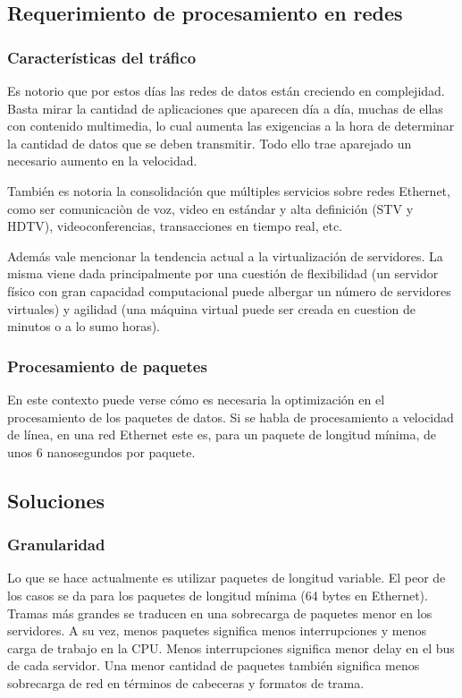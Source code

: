 \subsection{Requerimiento de procesamiento en redes}
\subsubsection{Características del tráfico}
Es notorio que por estos días las redes de datos están creciendo en complejidad. Basta mirar la cantidad de aplicaciones que aparecen día a día, muchas de ellas con contenido multimedia, lo cual aumenta las exigencias a la hora de determinar la cantidad de datos que se deben transmitir. Todo ello trae aparejado un necesario aumento en la velocidad. 

También es notoria la consolidación que múltiples servicios sobre redes Ethernet, como ser comunicaciòn de voz, video en estándar y alta definición (STV y HDTV), videoconferencias, transacciones en tiempo real, etc.

Además vale mencionar la tendencia actual a la virtualización de servidores. La misma viene dada principalmente por una cuestión de flexibilidad (un servidor físico con gran capacidad computacional puede albergar un número de servidores virtuales) y agilidad (una máquina virtual puede ser creada en cuestion de minutos o a lo sumo horas).

\subsubsection{Procesamiento de paquetes}
En este contexto puede verse cómo es necesaria la optimización en el procesamiento de los paquetes de datos. Si se habla de procesamiento a velocidad de línea, en una red Ethernet este es, para un paquete de longitud mínima, de unos 6 nanosegundos por paquete.


\subsection{Soluciones}
\subsubsection{Granularidad}
Lo que se hace actualmente es utilizar paquetes de longitud variable. El peor de los casos se da para los paquetes de longitud mínima (64 bytes en Ethernet). Tramas más grandes se traducen en una sobrecarga de paquetes menor en los servidores. A su vez, menos paquetes significa menos interrupciones y menos carga de trabajo en la CPU. Menos interrupciones significa menor delay en el bus de cada servidor. Una menor cantidad de paquetes también significa menos sobrecarga de red en términos de cabeceras y formatos de trama.

